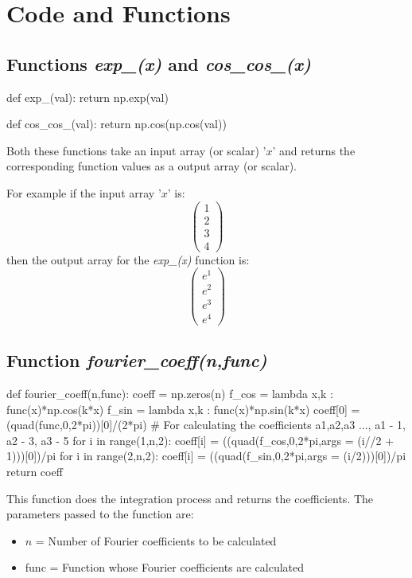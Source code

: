 \documentclass[12pt, a4paper]{article}
\begin{document}
\section{Code and Functions}
\subsection{Functions \textit{exp\_(x)} and \textit{cos\_cos\_(x)}}

\begin{py_code}
    def exp_(val):
        return np.exp(val)

    def cos_cos_(val):
        return np.cos(np.cos(val))
\end{py_code}

Both these functions take an input array (or scalar) '$x$' and returns the corresponding function values as a output array (or scalar).

For example if the input array '$x$' is:
\begin{equation*}    
\begin{pmatrix}
    1\\
    2\\
    3\\
    4
\end{pmatrix}
\end{equation*}
then the output array for the \textit{exp\_(x)} function is:
\begin{equation*}
    \begin{pmatrix}
    e^{1}\\
    e^{2}\\
    e^{3}\\
    e^{4}
\end{pmatrix}
\end{equation*}

\subsection{Function \textit{fourier\_coeff(n,func)}}
\begin{py_code}
    def fourier_coeff(n,func):
        coeff = np.zeros(n)
        f_cos = lambda x,k : func(x)*np.cos(k*x)
        f_sin = lambda x,k : func(x)*np.sin(k*x)
        coeff[0] = (quad(func,0,2*pi))[0]/(2*pi)
        # For calculating the coefficients a1,a2,a3 ..., a1 - 1, a2 - 3, a3 - 5
        for i in range(1,n,2):
            coeff[i] = ((quad(f_cos,0,2*pi,args = (i//2 + 1)))[0])/pi
        for i in range(2,n,2):
            coeff[i] = ((quad(f_sin,0,2*pi,args = (i/2)))[0])/pi
    return coeff
\end{py_code}
This function does the integration process and returns the coefficients.
The parameters passed to the function are:
\vspace{-0.5cm}
\begin{itemize}
    \item $n$ = Number of Fourier coefficients to be calculated
    \item func = Function whose Fourier coefficients are calculated
\end{itemize}
\vspace{-0.7cm}
\end{document}
